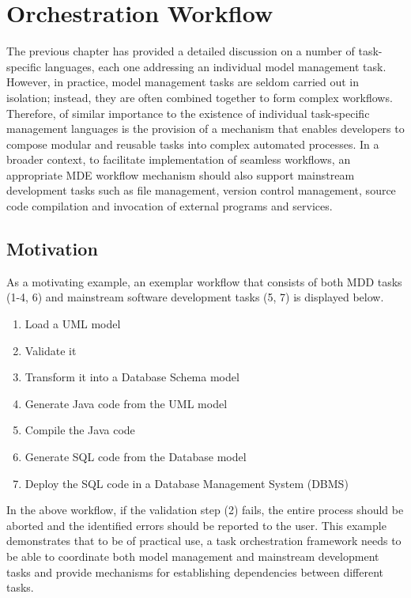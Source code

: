 \clearpage
\chapter{Orchestration Workflow}
\label{chp:Workflow}

The previous chapter has provided a detailed discussion on a number of task-specific languages, each one addressing an individual model management task. However, in practice, model management tasks are seldom carried out in isolation; instead, they are often combined together to form complex workflows. Therefore, of similar importance to the existence of individual task-specific management languages is the provision of a mechanism that enables developers to compose modular and reusable tasks into complex automated processes. In a broader context, to facilitate implementation of seamless workflows, an appropriate MDE workflow mechanism should also support mainstream development tasks such as file management, version control management, source code compilation and invocation of external programs and services.

\section{Motivation}
\label{sec:Workflow.Motivation}

As a motivating example, an exemplar workflow that consists of both MDD tasks (1-4, 6) and mainstream software development tasks (5, 7) is displayed below.

\begin{enumerate}
	\item Load a UML model
	\item Validate it
	\item Transform it into a Database Schema model
	\item Generate Java code from the UML model
	\item Compile the Java code
	\item Generate SQL code from the Database model
	\item Deploy the SQL code in a Database Management System (DBMS)
\end{enumerate}

In the above workflow, if the validation step (2) fails, the entire process should be aborted and the identified errors should be reported to the user. This example demonstrates that to be of practical use, a task orchestration framework needs to be able to coordinate both model management and mainstream development tasks and provide mechanisms for establishing dependencies between different tasks. 

